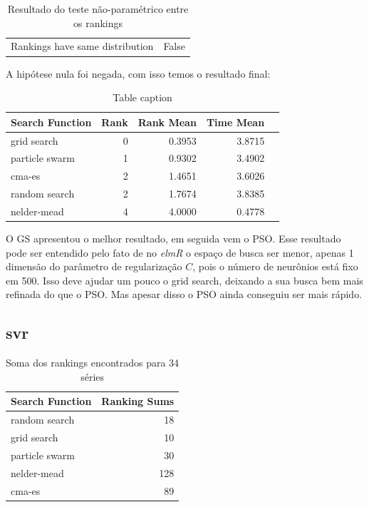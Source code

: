 \documentclass[preprint,12pt]{elsarticle}
\begin{document}
\begin{table}[h]
	\centering
	\begin{tabular}{l r}
		
		Rankings have same distribution  &  False \\
		
	\end{tabular}
	\caption{Resultado do teste não-paramétrico entre os rankings}
\end{table}

A hipótese nula foi negada, com isso temos o resultado final:

\begin{table}[h]
	\centering
	\begin{tabular}{lrrrr}
		\hline
		Search Function   &   Rank &   Rank Mean &      Time Mean \\
		\hline
		grid search       &      0 &    0.3953 &     3.8715  \\
		particle swarm    &      1 &    0.9302 &      3.4902  \\
		cma-es            &      2 &    1.4651  &     3.6026  \\
		random search     &      2 &    1.7674  &     3.8385  \\
		nelder-mead       &      4 &    4.0000    &    0.4778 \\
		\hline
	\end{tabular}
	
	\caption{Table caption}
\end{table}

O GS apresentou o melhor resultado, em seguida vem o PSO. Esse resultado pode ser entendido pelo fato de no \textit{elmR} o espaço de busca ser menor, apenas 1 dimensão do parâmetro de regularização $C$, pois o número de neurônios está fixo em 500. Isso deve ajudar um pouco o grid search, deixando a sua busca bem mais refinada do que o PSO. Mas apesar disso o PSO ainda conseguiu ser mais rápido.

\subsection{svr}

\begin{table}[h]
	\centering
	\begin{tabular}{lr}
		\hline
		Search Function   &   Ranking Sums \\
		\hline
		random search     &             18 \\
		grid search       &             10 \\
		particle swarm    &             30 \\
		nelder-mead       &            128 \\
		cma-es            &             89 \\
		\hline
	\end{tabular}
	
	\caption{Soma dos rankings encontrados para 34 séries}
\end{table}
\end{document}
